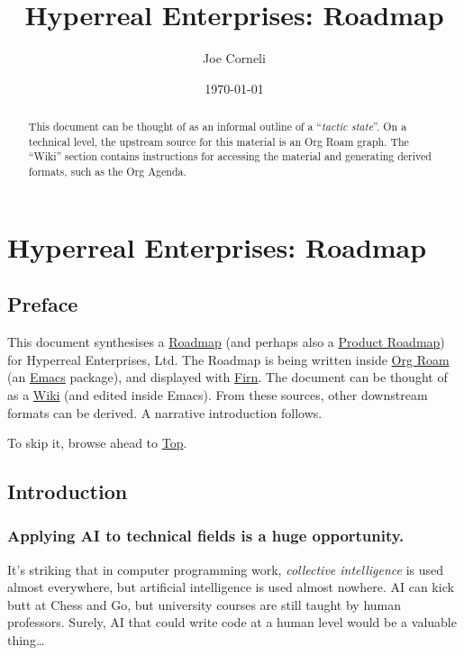 \documentclass[11pt]{article}
\author{Joe Corneli}
\date{\today}
\title{Hyperreal Enterprises: Roadmap}
\begin{document}
\maketitle
\begin{abstract}
\noindent This document can be thought of as an informal outline of a “\emph{tactic state}”.  On a technical level, the upstream source for this material is an Org Roam graph.  The “Wiki” section contains instructions for accessing the material and generating derived formats, such as the Org Agenda.
\end{abstract}

\setcounter{tocdepth}{2}
\tableofcontents
\section{Hyperreal Enterprises: Roadmap}
\label{sec:org1dd8ae1}

\subsection{Preface}
\label{sec:org5ce2cb8}
This document synthesises a \href{http://www.peeragogy.org/pattern-roadmap.html}{Roadmap} (and perhaps also a \href{http://scrumbook.org/value-stream/product-roadmap.html}{Product
Roadmap}) for Hyperreal Enterprises, Ltd.  The Roadmap is being written
inside \href{https://github.com/org-roam/org-roam}{Org Roam} (an \href{https://www.gnu.org/software/emacs/}{Emacs} package), and displayed with \href{https://github.com/theiceshelf/firn}{Firn}.  The
document can be thought of as a \hyperref[sec:org675d604]{Wiki} (and edited inside Emacs).  From
these sources, other downstream formats can be derived.  A narrative
introduction follows.

To skip it, browse ahead to \hyperref[sec:org7f060ab]{Top}.

\subsection{Introduction}
\label{sec:org226b341}

\subsubsection{Applying AI to technical fields is a huge opportunity.}
\label{sec:org0228c7c}

It’s striking that in computer programming work, \emph{collective
intelligence} is used almost everywhere, but artificial intelligence is
used almost nowhere.  AI can kick butt at Chess and Go, but university
courses are still taught by human professors.  Surely, AI that could
write code at a human level would be a valuable thing\ldots{}
\end{document}
